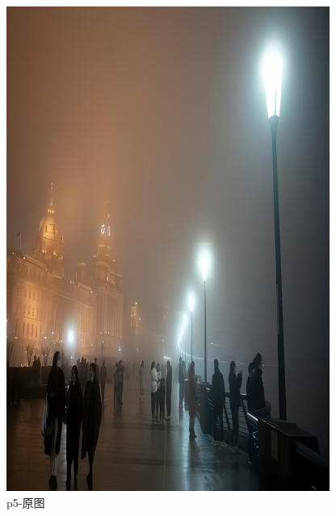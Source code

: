 \documentclass[12pt]{article}
\begin{document}
\begin{figure}[!h]
    \centering
    \begin{minipage}[t]{0.24\linewidth}
        \centering
        \includegraphics[width=0.9\linewidth]{sample_pictures/p5.jpg}
        \caption*{p5-原图}
    \end{minipage}
    \begin{minipage}[t]{0.24\linewidth}
        \centering

\end{minipage}
\end{figure}
\end{document}
